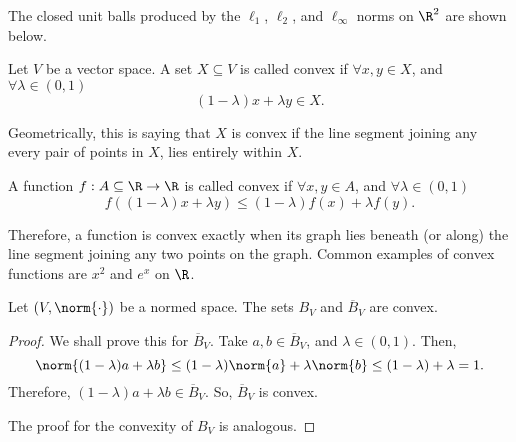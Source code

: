 \documentclass[draft]{penrose}
\newcommand{\oB}{B}
\newcommand{\cB}{\overline{B}}
\begin{document}
The closed unit balls produced by the $\ell_{1}$, $\ell_{2}$, and $\ell_{\infty}$ norms on $\R^2$ are shown below.
\begin{center}
\end{center}

\begin{ndfn}
  Let $V$ be a vector space. A set $X \subseteq V$ is called convex if $\forall x,y \in X$, and $\forall \lambda \in (0,1)$
  \begin{equation*}
    (1-\lambda) x + \lambda y \in X.
  \end{equation*}
\end{ndfn}
Geometrically, this is saying that $X$ is convex if the line segment joining any every pair of points in $X$, lies entirely within $X$.

\begin{ndfn}
  A function $f : A \subseteq \R \to \R$ is called convex if $\forall x,y \in A$, and $\forall \lambda \in (0,1)$
  \begin{equation*}
    f\left((1-\lambda) x + \lambda y\right) \leq (1-\lambda) f(x) + \lambda f(y).
  \end{equation*}
\end{ndfn}
Therefore, a function is convex exactly when its graph lies beneath (or along) the line segment joining any two points on the graph. Common examples of convex functions are $x^2$ and $e^x$ on $\R$.

\begin{nprop}
  Let $(V, \norm{\cdot})$ be a normed space. The sets $\oB_{V}$ and $\cB_{V}$ are convex.
\end{nprop}
\begin{proof}
  We shall prove this for $\cB_{V}$. Take $a, b \in \cB_{V}$, and $\lambda \in (0,1)$. Then,
  \begin{equation*}
    \norm{(1-\lambda) a + \lambda b}
    \leq (1-\lambda) \norm{a} + \lambda \norm{b}
    \leq (1-\lambda) + \lambda
     = 1.
  \end{equation*}
  Therefore, $(1-\lambda) a + \lambda b \in \cB_{V}$. So, $\cB_{V}$ is convex.

  The proof for the convexity of $\oB_{V}$ is analogous.
\end{proof}
\end{document}

